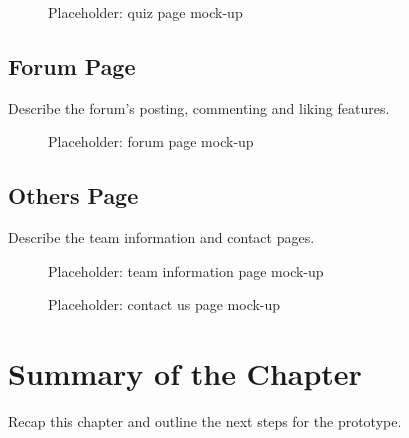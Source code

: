 \documentclass[
  12pt,
  a4paper,
]{report}
\begin{document}
\begin{figure}
\centering
{}
\caption{Placeholder: quiz page mock-up}
\end{figure}

\subsection{Forum Page}\label{forum-page}

Describe the forum's posting, commenting and liking features.

\begin{figure}
\centering
{}
\caption{Placeholder: forum page mock-up}
\end{figure}

\subsection{Others Page}\label{others-page}

Describe the team information and contact pages.

\begin{figure}
\centering
{}
\caption{Placeholder: team information page mock-up}
\end{figure}

\begin{figure}
\centering
{}
\caption{Placeholder: contact us page mock-up}
\end{figure}

\section{Summary of the Chapter}\label{summary-of-the-chapter-3}

Recap this chapter and outline the next steps for the prototype.
\end{document}
